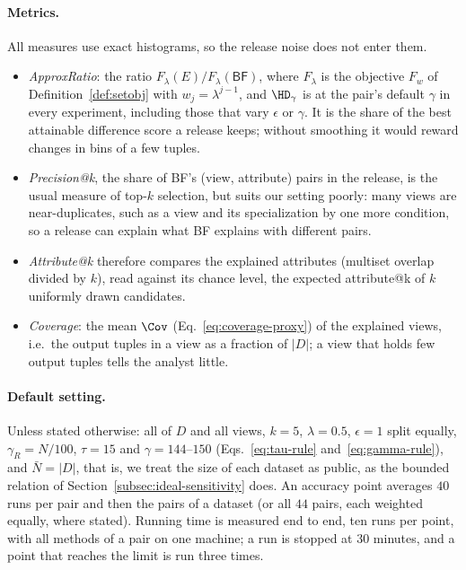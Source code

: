 \paragraph{Metrics.}
All measures use exact histograms, so the release noise does not enter them.
\begin{itemize}[leftmargin=*,itemsep=1pt,topsep=2pt]
  \item \emph{ApproxRatio}: the ratio $F_\lambda(E)/F_\lambda(\textsf{BF})$, where $F_\lambda$ is the objective $F_w$ of Definition~\ref{def:setobj} with $w_j=\lambda^{j-1}$, and $\HD_\gamma$ is at the pair's default $\gamma$ in every experiment, including those that vary $\epsilon$ or $\gamma$. It is the share of the best attainable difference score a release keeps; without smoothing it would reward changes in bins of a few tuples.
  \item \emph{Precision@k}, the share of \textsf{BF}'s (view, attribute) pairs in the release, is the usual measure of top-$k$ selection, but suits our setting poorly: many views are near-duplicates, such as a view and its specialization by one more condition, so a release can explain what \textsf{BF} explains with different pairs.
  \item \emph{Attribute@k} therefore compares the explained attributes (multiset overlap divided by $k$), read against its chance level, the expected attribute@k of $k$ uniformly drawn candidates.
  \item \emph{Coverage}: the mean $\Cov$ (Eq.~\eqref{eq:coverage-proxy}) of the explained views, i.e.\ the output tuples in a view as a fraction of $|D|$; a view that holds few output tuples tells the analyst little.
\end{itemize}

\paragraph{Default setting.}
Unless stated otherwise: all of $D$ and all views, $k=5$, $\lambda=0.5$, $\epsilon=1$ split equally, $\gamma_R=N/100$, $\tau=15$ and $\gamma=144$--$150$ (Eqs.~\eqref{eq:tau-rule} and~\eqref{eq:gamma-rule}), and $\bar N=|D|$, that is, we treat the size of each dataset as public, as the bounded relation of Section~\ref{subsec:ideal-sensitivity} does.
An accuracy point averages $40$ runs per pair and then the pairs of a dataset (or all $44$ pairs, each weighted equally, where stated).
Running time is measured end to end, ten runs per point, with all methods of a pair on one machine; a run is stopped at $30$ minutes, and a point that reaches the limit is run three times.

